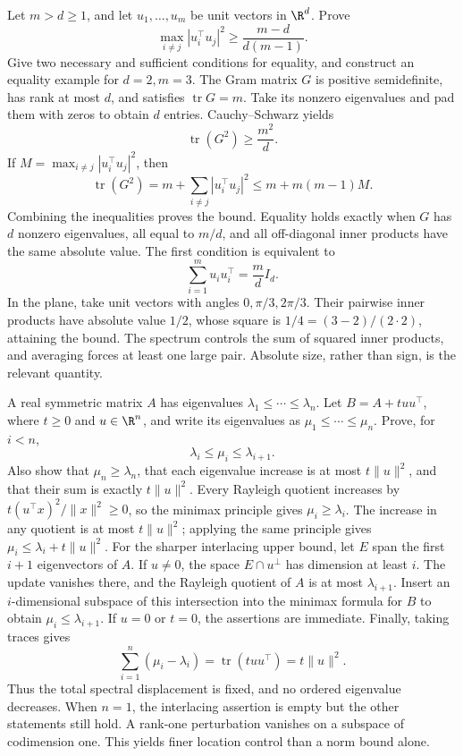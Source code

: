 Let $m>d\ge1$, and let $u_1,\ldots,u_m$ be unit vectors in $\R^d$. Prove
\[
 \max_{i\ne j}|u_i^\top u_j|^2\ge\frac{m-d}{d(m-1)}.
\]
Give two necessary and sufficient conditions for equality, and construct an equality example for $d=2,m=3$.
\solution The Gram matrix $G$ is positive semidefinite, has rank at most $d$, and satisfies $\operatorname{tr}G=m$. Take its nonzero eigenvalues and pad them with zeros to obtain $d$ entries. Cauchy--Schwarz yields
\[
 \operatorname{tr}(G^2)\ge\frac{m^2}{d}.
\]
If $M=\max_{i\ne j}|u_i^\top u_j|^2$, then
\[
 \operatorname{tr}(G^2)=m+\sum_{i\ne j}|u_i^\top u_j|^2
 \le m+m(m-1)M.
\]
Combining the inequalities proves the bound. Equality holds exactly when $G$ has $d$ nonzero eigenvalues, all equal to $m/d$, and all off-diagonal inner products have the same absolute value. The first condition is equivalent to
\[
 \sum_{i=1}^m u_i u_i^\top=\frac md I_d.
\]
In the plane, take unit vectors with angles $0,\pi/3,2\pi/3$. Their pairwise inner products have absolute value $1/2$, whose square is $1/4=(3-2)/(2\cdot2)$, attaining the bound.
\insight The spectrum controls the sum of squared inner products, and averaging forces at least one large pair. Absolute size, rather than sign, is the relevant quantity.

A real symmetric matrix $A$ has eigenvalues $\lambda_1\le\cdots\le\lambda_n$. Let $B=A+tuu^\top$, where $t\ge0$ and $u\in\R^n$, and write its eigenvalues as $\mu_1\le\cdots\le\mu_n$. Prove, for $i<n$,
\[
 \lambda_i\le\mu_i\le\lambda_{i+1}.
\]
Also show that $\mu_n\ge\lambda_n$, that each eigenvalue increase is at most $t\|u\|^2$, and that their sum is exactly $t\|u\|^2$.
\solution Every Rayleigh quotient increases by $t(u^\top x)^2/\|x\|^2\ge0$, so the minimax principle gives $\mu_i\ge\lambda_i$. The increase in any quotient is at most $t\|u\|^2$; applying the same principle gives $\mu_i\le\lambda_i+t\|u\|^2$.
For the sharper interlacing upper bound, let $E$ span the first $i+1$ eigenvectors of $A$. If $u\ne0$, the space $E\cap u^\perp$ has dimension at least $i$. The update vanishes there, and the Rayleigh quotient of $A$ is at most $\lambda_{i+1}$. Insert an $i$-dimensional subspace of this intersection into the minimax formula for $B$ to obtain $\mu_i\le\lambda_{i+1}$. If $u=0$ or $t=0$, the assertions are immediate.
Finally, taking traces gives
\[
 \sum_{i=1}^n(\mu_i-\lambda_i)
 =\operatorname{tr}(tuu^\top)=t\|u\|^2.
\]
Thus the total spectral displacement is fixed, and no ordered eigenvalue decreases. When $n=1$, the interlacing assertion is empty but the other statements still hold.
\insight A rank-one perturbation vanishes on a subspace of codimension one. This yields finer location control than a norm bound alone.

